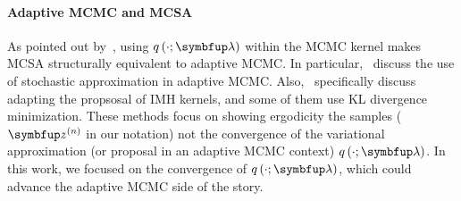\vspace{-0.12in}
\paragraph{Adaptive MCMC and MCSA}
As pointed out by~\citet{pmlr-v124-ou20a}, using \(q\left(\cdot; \vlambda\right)\) within the MCMC kernel makes MCSA structurally equivalent to adaptive MCMC.
In particular,~\citet{10.1007/s11222-008-9110-y, garthwaite_adaptive_2016, pmlr-v151-brofos22a, gabrie_adaptive_2022} discuss the use of stochastic approximation in adaptive MCMC.
Also,~\citet{andrieu_ergodicity_2006, keith_adaptive_2008, holden_adaptive_2009, giordani_adaptive_2010, pmlr-v151-brofos22a, habib2018auxiliary, neklyudov_metropolishastings_2019} specifically discuss adapting the propsosal of IMH kernels, and some of them use KL divergence minimization.
These methods focus on showing ergodicity the samples (\(\vz^{(n)}\) in our notation) not the convergence of the variational approximation (or proposal in an adaptive MCMC context) \(q\left(\cdot; \vlambda\right)\).
In this work, we focused on the convergence of \(q\left(\cdot; \vlambda\right)\), which could advance the adaptive MCMC side of the story.



